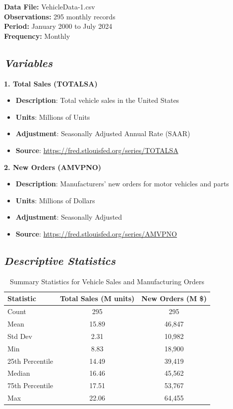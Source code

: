 \documentclass[12pt]{article}
\begin{document}
\textbf{Data File:} VehicleData-1.csv\\
\textbf{Observations:} 295 monthly records\\
\textbf{Period:} January 2000 to July 2024\\
\textbf{Frequency:} Monthly

\subsection*{\textit{Variables}}

\textbf{1. Total Sales (TOTALSA)}
\begin{itemize}
    \item \textbf{Description}: Total vehicle sales in the United States
    \item \textbf{Units}: Millions of Units
    \item \textbf{Adjustment}: Seasonally Adjusted Annual Rate (SAAR)
    \item \textbf{Source}: \url{https://fred.stlouisfed.org/series/TOTALSA}
\end{itemize}

\textbf{2. New Orders (AMVPNO)}
\begin{itemize}
    \item \textbf{Description}: Manufacturers' new orders for motor vehicles and parts
    \item \textbf{Units}: Millions of Dollars
    \item \textbf{Adjustment}: Seasonally Adjusted
    \item \textbf{Source}: \url{https://fred.stlouisfed.org/series/AMVPNO}
\end{itemize}

\subsection*{\textit{Descriptive Statistics}}

\begin{table}[H]
\centering
\caption{Summary Statistics for Vehicle Sales and Manufacturing Orders}
\begin{tabular}{lcc}
\toprule
Statistic & Total Sales (M units) & New Orders (M \$) \\
\midrule
Count & 295 & 295 \\
Mean & 15.89 & 46,847 \\
Std Dev & 2.31 & 10,982 \\
Min & 8.83 & 18,900 \\
25th Percentile & 14.49 & 39,419 \\
Median & 16.46 & 45,562 \\
75th Percentile & 17.51 & 53,767 \\
Max & 22.06 & 64,455 \\
\bottomrule
\end{tabular}
\end{table}
\end{document}
